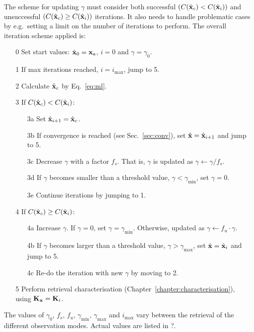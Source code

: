 The scheme for updating $\gamma$ must consider both successful
$(C(\hat{\mathbf{x}}_c) < C(\hat{\mathbf{x}}_i))$ and
unsuccessful $(C(\hat{\mathbf{x}}_c) \geq C(\hat{\mathbf{x}}_i))$ iterations. It also
needs to handle problematic cases by e.g.\ setting a limit on the number of
iterations to perform. The overall iteration scheme applied is:
\begin{itemize}
\item[0] Set start values: $\hat{\mathbf{x}}_0 = \mathbf{x}_{a}$, $i=0$ and $\gamma=\gamma_0$.
\item[1] If max iterations reached, $i=i_\mathrm{max}$, jump to 5. 
\item[2] Calculate $\hat{\mathbf{x}}_c$ by Eq.~\ref{eq:ml}.
\item[3] If $C(\hat{\mathbf{x}}_c) < C(\hat{\mathbf{x}}_i)$:
  \begin{itemize}
  \item[3a] Set $\hat{\mathbf{x}}_{i+1}=\hat{\mathbf{x}}_c$.
  \item[3b] If convergence is reached (see Sec.~\ref{sec:conv}), set
    $\hat{\mathbf{x}}=\hat{\mathbf{x}}_{i+1}$ and jump to 5.
  \item[3c] Decrease $\gamma$ with a factor $f_s$. That is, $\gamma$ is updated
    as $\gamma\leftarrow\gamma/f_s$. 
  \item[3d] If $\gamma$ becomes smaller than a 
    threshold value, $\gamma<\gamma_\mathrm{min}$, set $\gamma=0$.
  \item[3e] Continue iterations by jumping to 1.
  \end{itemize}
\item[4] If $C(\hat{\mathbf{x}}_c) \geq C(\hat{\mathbf{x}}_i)$:
  \begin{itemize}
  \item[4a] Increase $\gamma$. If $\gamma=0$, set $\gamma=\gamma_\mathrm{min}$.
    Otherwise, updated as $\gamma\leftarrow f_u\cdot\gamma$.
  \item[4b] If $\gamma$ becomes larger than a threshold value,
    $\gamma>\gamma_\mathrm{max}$, set $\hat{\mathbf{x}}=\hat{\mathbf{x}}_i$ and jump to 5.
  \item[4c] Re-do the iteration with new $\gamma$ by moving to 2.
  \end{itemize}
\item[5] Perform retrieval characterisation
  (Chapter~\ref{chapter:characterisation}), using $\mathbf{K}_{\mathbf{x}}=\mathbf{K}_{i}$.
\end{itemize}
The values of $\gamma_0$, $f_s$, $f_u$, $\gamma_\mathrm{min}$,
$\gamma_\mathrm{max}$ and $i_\mathrm{max}$ vary between the retrieval of the
different observation modes. Actual values are listed in ?.
\\


